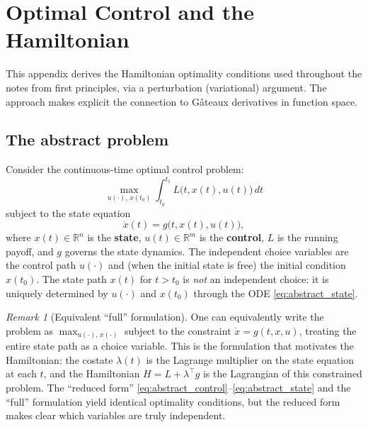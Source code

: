 \documentclass[12pt,a4paper]{article}
\theoremstyle{definition}
\theoremstyle{plain}
\theoremstyle{remark}
\newtheorem{remark}{Remark}[section]
\newcommand{\R}{\mathbb{R}}
\begin{document}
\section{Optimal Control and the Hamiltonian}
\label{app:hamiltonian_primer}

This appendix derives the Hamiltonian optimality conditions used throughout the notes from first principles, via a perturbation (variational) argument. The approach makes explicit the connection to Gâteaux derivatives in function space.

\subsection{The abstract problem}

Consider the continuous-time optimal control problem:
\begin{equation}
\label{eq:abstract_control}
  \max_{u(\cdot),\, x(t_0)} \int_{t_0}^{t_1} L\bigl(t, x(t), u(t)\bigr)\, dt
\end{equation}
subject to the state equation
\begin{equation}
\label{eq:abstract_state}
  \dot{x}(t) = g\bigl(t, x(t), u(t)\bigr),
\end{equation}
where $x(t) \in \R^n$ is the \textbf{state}, $u(t) \in \R^m$ is the \textbf{control}, $L$ is the running payoff, and $g$ governs the state dynamics. The independent choice variables are the control path $u(\cdot)$ and (when the initial state is free) the initial condition $x(t_0)$. The state path $x(t)$ for $t > t_0$ is \emph{not} an independent choice: it is uniquely determined by $u(\cdot)$ and $x(t_0)$ through the ODE \eqref{eq:abstract_state}.

\begin{remark}[Equivalent ``full'' formulation]
\label{rem:full_formulation}
One can equivalently write the problem as $\max_{u(\cdot),\, x(\cdot)}$ subject to the constraint $\dot{x} = g(t,x,u)$, treating the entire state path as a choice variable. This is the formulation that motivates the Hamiltonian: the costate $\lambda(t)$ is the Lagrange multiplier on the state equation at each $t$, and the Hamiltonian $H = L + \lambda^\top g$ is the Lagrangian of this constrained problem. The ``reduced form'' \eqref{eq:abstract_control}--\eqref{eq:abstract_state} and the ``full'' formulation yield identical optimality conditions, but the reduced form makes clear which variables are truly independent.
\end{remark}
\end{document}
